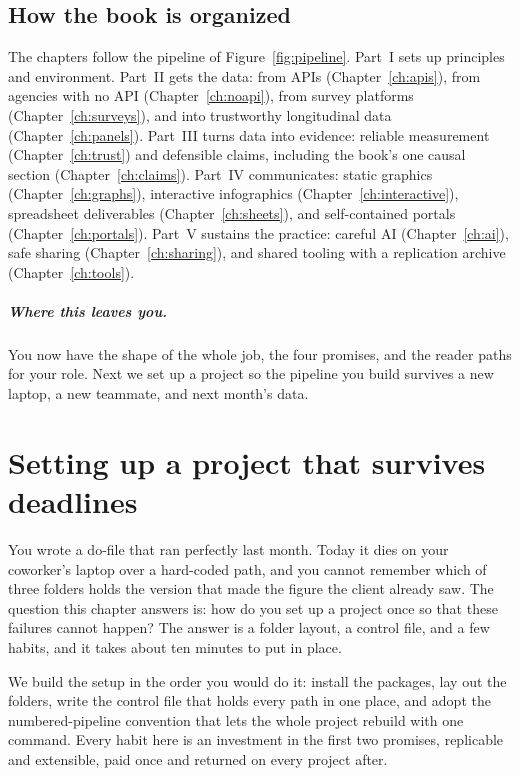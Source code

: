 \documentclass[
    a4paper,
    fontsize=10pt,
    twoside=true,
    numbers=noenddot,
]{kaobook}
\begin{document}
\section{How the book is organized}
The chapters follow the pipeline of Figure~\ref{fig:pipeline}. Part~I sets up principles and environment. Part~II gets the data: from APIs (Chapter~\ref{ch:apis}), from agencies with no API (Chapter~\ref{ch:noapi}), from survey platforms (Chapter~\ref{ch:surveys}), and into trustworthy longitudinal data (Chapter~\ref{ch:panels}). Part~III turns data into evidence: reliable measurement (Chapter~\ref{ch:trust}) and defensible claims, including the book's one causal section (Chapter~\ref{ch:claims}). Part~IV communicates: static graphics (Chapter~\ref{ch:graphs}), interactive infographics (Chapter~\ref{ch:interactive}), spreadsheet deliverables (Chapter~\ref{ch:sheets}), and self-contained portals (Chapter~\ref{ch:portals}). Part~V sustains the practice: careful AI (Chapter~\ref{ch:ai}), safe sharing (Chapter~\ref{ch:sharing}), and shared tooling with a replication archive (Chapter~\ref{ch:tools}).

\paragraph{Where this leaves you.} You now have the shape of the whole job, the four promises, and the reader paths for your role. Next we set up a project so the pipeline you build survives a new laptop, a new teammate, and next month's data.

\chapter{Setting up a project that survives deadlines}\label{ch:workshop}

You wrote a do-file that ran perfectly last month. Today it dies on your coworker's laptop over a hard-coded path, and you cannot remember which of three folders holds the version that made the figure the client already saw. The question this chapter answers is: how do you set up a project once so that these failures cannot happen? The answer is a folder layout, a control file, and a few habits, and it takes about ten minutes to put in place.

We build the setup in the order you would do it: install the packages, lay out the folders, write the control file that holds every path in one place, and adopt the numbered-pipeline convention that lets the whole project rebuild with one command. Every habit here is an investment in the first two promises, replicable and extensible, paid once and returned on every project after.
\end{document}
